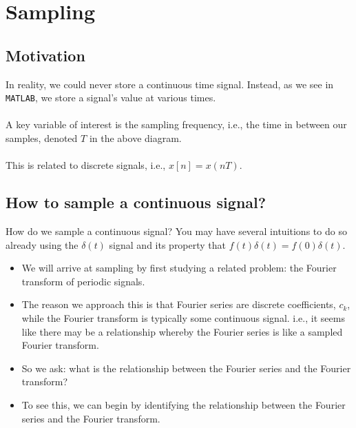 \documentclass[10pt]{article}
\begin{document}
\section*{Sampling}
\subsection*{Motivation}
In reality, we could never store a continuous time signal.  Instead, as we see in \texttt{MATLAB}, we store a signal's value at various times.\\\\
A key variable of interest is the sampling frequency, i.e., the time in between our samples, denoted $T$ in the above diagram.\\\\
This is related to discrete signals, i.e., $x[n] = x(nT)$.
\subsection*{How to sample a continuous signal?}
How do we sample a continuous signal?  You may have several intuitions to do so already using the $\delta(t)$ signal and its property that $f(t) \delta(t) = f(0) \delta(t)$.
\begin{itemize}
    \item We will arrive at sampling by first studying a related problem: the Fourier transform of periodic signals.
    \item The reason we approach this is that Fourier series are discrete coefficients, $c_k$, while the Fourier transform is typically some continuous signal.  i.e., it seems like there may be a relationship whereby the Fourier series is like a sampled Fourier transform.
    \item So we ask: what is the relationship between the Fourier series and the Fourier transform?
    \item To see this, we can begin by identifying the relationship between the Fourier series and the Fourier transform.
\end{itemize}
\end{document}
